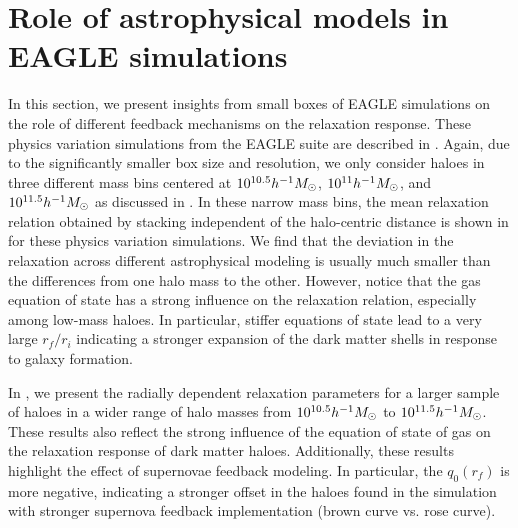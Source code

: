 \section{Role of astrophysical models in EAGLE simulations}
\label{sec:res-physvar-eagle}

In this section, we present insights from small boxes of EAGLE simulations on the role of different feedback mechanisms on the relaxation response. These physics variation simulations from the EAGLE suite are described in . Again, due to the significantly smaller box size and resolution, we only consider haloes in three different mass bins centered at $10^{10.5} h^{-1}M_{\odot}$, $10^{11} h^{-1}M_{\odot}$, and $10^{11.5} h^{-1}M_{\odot}$ as discussed in . In these narrow mass bins, the mean relaxation relation obtained by stacking independent of the halo-centric distance is shown in  for these physics variation simulations. We find that the deviation in the relaxation across different astrophysical modeling is usually much smaller than the differences from one halo mass to the other. However, notice that the gas equation of state has a strong influence on the relaxation relation, especially among low-mass haloes. In particular, stiffer equations of state lead to a very large $r_f/r_i$ indicating a stronger expansion of the dark matter shells in response to galaxy formation.

In , we present the radially dependent relaxation parameters for a larger sample of haloes in a wider range of halo masses from $10^{10.5} h^{-1}M_{\odot}$ to $10^{11.5} h^{-1}M_{\odot}$. These results also reflect the strong influence of the equation of state of gas on the relaxation response of dark matter haloes. Additionally, these results highlight the effect of supernovae feedback modeling. In particular, the $q_0(r_f)$ is more negative, indicating a stronger offset in the haloes found in the simulation with stronger supernova feedback implementation (brown curve vs. rose curve).    

